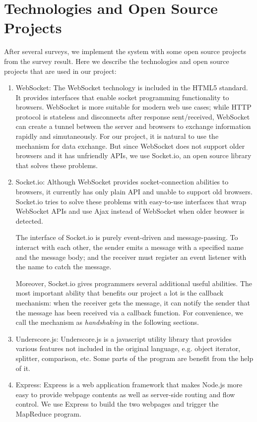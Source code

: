 \section{Technologies and Open Source Projects}

After several surveys, we implement the system with some open source projects from the survey result. Here we describe the technologies and open source projects that are used in our project:

\begin{enumerate}

\item WebSocket\cite{websocket}:
  The WebSocket technology is included in the HTML5 standard. It provides interfaces that enable socket programming functionality to browsers.
  WebSocket is more suitable for modern web use cases; while HTTP protocol is stateless and disconnects after response sent/received, WebSocket can create a tunnel between the server and browsers to exchange information rapidly and simutaneously.
  For our project, it is natural to use the mechanism for data exchange. But since WebSocket does not support older browsers and it has unfriendly APIs, we use Socket.io, an open source library that solves these problems.

\item Socket.io\cite{socketio}:
  Although WebSocket provides socket-connection abilities to browsers, it currently has only plain API and unable to support old browsers. Socket.io tries to solve these problems with easy-to-use interfaces that wrap WebSocket APIs and use Ajax instead of WebSocket when older browser is detected.

  The interface of Socket.io is purely event-driven and message-passing. To interact with each other, the sender emits a message with a specified name and the message body; and the receiver must register an event listener with the name to catch the message.

  Moreover, Socket.io gives programmers several additional useful abilities. The most important ability that benefits our project a lot is the callback mechanism: when the receiver gets the message, it can notify the sender that the message has been received via a callback function. For convenience, we call the mechanism as \emph{handshaking} in the following sections. 

\item Underscore.js\cite{sockjs}:
  Underscore.js is a javascript utility library that provides various features not included in the original language, e.g. object iterator, splitter, comparison, etc. Some parts of the program are benefit from the help of it.

\item Express:
  Express is a web application framework that makes Node.js more easy to provide webpage contents as well as server-side routing and flow control. We use Express to build the two webpages and trigger the MapReduce program.

\end{enumerate}
